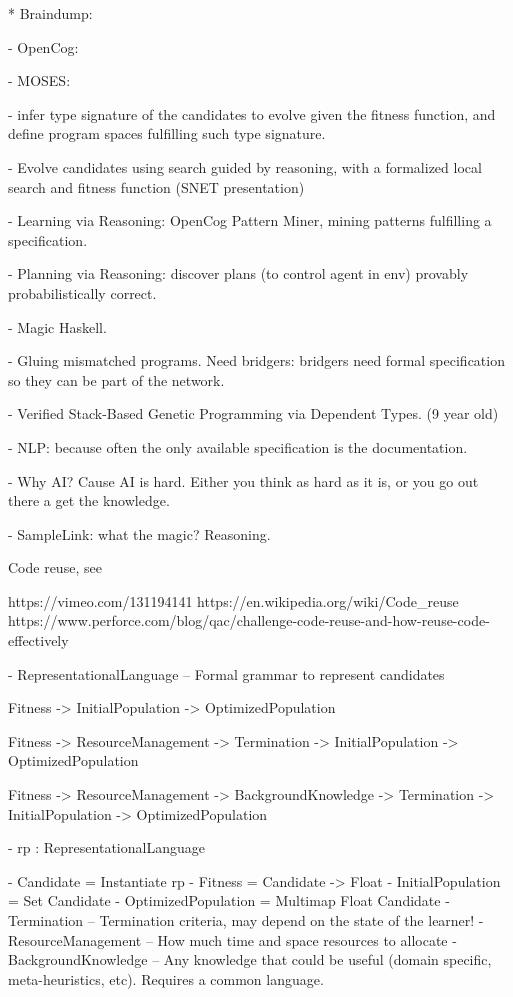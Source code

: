 \documentclass[aspectratio=169]{beamer}
\begin{document}
\begin{frame}
* Braindump:

  - OpenCog:
  
    - MOSES:

      - infer type signature of the candidates to evolve given the
      fitness function, and define program spaces fulfilling such type
      signature.

      - Evolve candidates using search guided by reasoning, with a
      formalized local search and fitness function (SNET presentation)

    - Learning via Reasoning: OpenCog Pattern Miner, mining patterns
    fulfilling a specification.

    - Planning via Reasoning: discover plans (to control agent in env)
    provably probabilistically correct.

  - Magic Haskell.

  - Gluing mismatched programs. Need bridgers: bridgers need formal
  specification so they can be part of the network.

  - Verified Stack-Based Genetic Programming via Dependent Types. (9
  year old)
  
  - NLP: because often the only available specification is the
  documentation.

  - Why AI? Cause AI is hard. Either you think as hard as it is, or
  you go out there a get the knowledge.

  - SampleLink: what the magic? Reasoning.
\end{frame}

\begin{frame}
  Code reuse, see

  https://vimeo.com/131194141
  https://en.wikipedia.org/wiki/Code_reuse
  https://www.perforce.com/blog/qac/challenge-code-reuse-and-how-reuse-code-effectively
\end{frame}

\begin{frame}

  - RepresentationalLanguage     -- Formal grammar to represent candidates
  
  Fitness -> InitialPopulation -> OptimizedPopulation

  Fitness -> ResourceManagement -> Termination -> InitialPopulation -> OptimizedPopulation

  Fitness -> ResourceManagement -> BackgroundKnowledge -> Termination -> InitialPopulation -> OptimizedPopulation

- rp : RepresentationalLanguage

- Candidate = Instantiate rp
- Fitness = Candidate -> Float
- InitialPopulation = Set Candidate
- OptimizedPopulation = Multimap Float Candidate
- Termination -- Termination criteria, may depend on the state of the learner!
- ResourceManagement -- How much time and space resources to allocate
- BackgroundKnowledge -- Any knowledge that could be useful (domain specific, meta-heuristics, etc). Requires a common language.

\end{frame}
\end{document}
